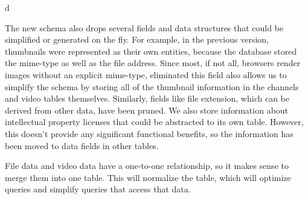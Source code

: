 d\documentclass[a4paper,12pt]{report}
\begin{document}
The new schema also drops several fields and data structures that could be simplified or generated on the fly. 
For example, in the previous version, thumbnails were represented as their own entities, because the database stored the mime-type as well as the file address. 
Since most, if not all, browsers render images without an explicit mime-type, eliminated this field also allows us to simplify the schema by storing all of the thumbnail information in the channels and video tables themselves. Similarly, fields like file extension, which can be derived from other data, have been pruned. 
We also store information about intellectual property licenses that could be abstracted to its own table. 
However, this doesn't provide any significant functional benefits, so the information has been moved to data fields in other tables.

File data and video data have a one-to-one relationship, so it makes sense to merge them into one table. 
This will normalize the table, which will optimize queries and simplify queries that access that data.
\end{document}
